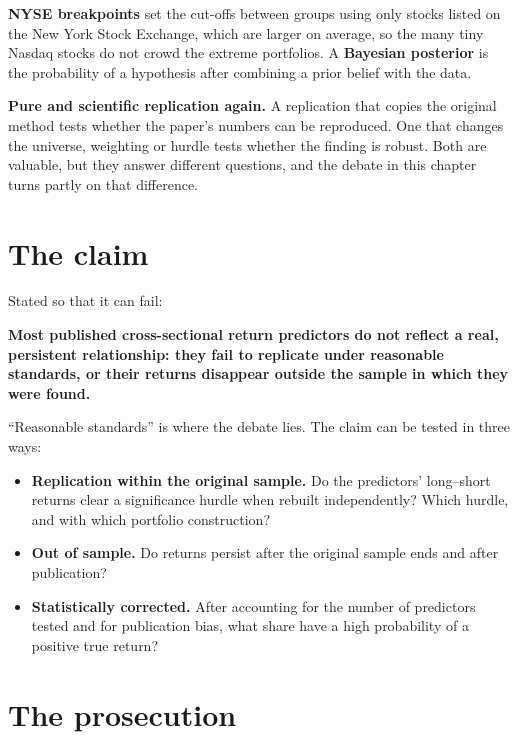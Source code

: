 \textbf{NYSE breakpoints} set the cut-offs between groups using only stocks listed on the New York Stock Exchange, which are larger on average, so the many tiny Nasdaq stocks do not crowd the extreme portfolios. A \textbf{Bayesian posterior} is the probability of a hypothesis after combining a prior belief with the data.

\textbf{Pure and scientific replication again.} A replication that copies the original method tests whether the paper's numbers can be reproduced. One that changes the universe, weighting or hurdle tests whether the finding is robust. Both are valuable, but they answer different questions, and the debate in this chapter turns partly on that difference.

\section{The claim}
\label{sec:10-claim}

Stated so that it can fail:

\begin{callout}
\textbf{Most published cross-sectional return predictors do not reflect a real, persistent relationship: they fail to replicate under reasonable standards, or their returns disappear outside the sample in which they were found.}
\end{callout}

``Reasonable standards'' is where the debate lies. The claim can be tested in three ways:

\begin{itemize}
  \item \textbf{Replication within the original sample.} Do the predictors' long--short returns clear a significance hurdle when rebuilt independently? Which hurdle, and with which portfolio construction?
  \item \textbf{Out of sample.} Do returns persist after the original sample ends and after publication?
  \item \textbf{Statistically corrected.} After accounting for the number of predictors tested and for publication bias, what share have a high probability of a positive true return?
\end{itemize}

\section{The prosecution}
\label{sec:10-prosecution}

